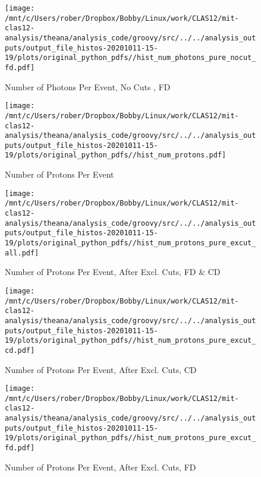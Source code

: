 \documentclass{article}
\begin{document}
\begin{landscape}
\begin{figure}[h]
        \texttt{[image: /mnt/c/Users/rober/Dropbox/Bobby/Linux/work/CLAS12/mit-clas12-analysis/theana/analysis\_code/groovy/src/../../analysis\_outputs/output\_file\_histos-20201011-15-19/plots/original\_python\_pdfs//hist\_num\_photons\_pure\_nocut\_fd.pdf]}
        \captionsetup{textformat=empty,labelformat=blank}
        \caption{Number of Photons Per Event, No Cuts , FD}
    \end{figure}
    \clearpage
    
    \begin{figure}[h]
        \centering

        \texttt{[image: /mnt/c/Users/rober/Dropbox/Bobby/Linux/work/CLAS12/mit-clas12-analysis/theana/analysis\_code/groovy/src/../../analysis\_outputs/output\_file\_histos-20201011-15-19/plots/original\_python\_pdfs//hist\_num\_protons.pdf]}
        \captionsetup{textformat=empty,labelformat=blank}
        \caption{Number of Protons Per Event}
    \end{figure}
    \clearpage
    
    \begin{figure}[h]
        \centering

        \texttt{[image: /mnt/c/Users/rober/Dropbox/Bobby/Linux/work/CLAS12/mit-clas12-analysis/theana/analysis\_code/groovy/src/../../analysis\_outputs/output\_file\_histos-20201011-15-19/plots/original\_python\_pdfs//hist\_num\_protons\_pure\_excut\_all.pdf]}
        \captionsetup{textformat=empty,labelformat=blank}
        \caption{Number of Protons Per Event, After Excl. Cuts, FD \& CD}
    \end{figure}
    \clearpage
    
    \begin{figure}[h]
        \centering

        \texttt{[image: /mnt/c/Users/rober/Dropbox/Bobby/Linux/work/CLAS12/mit-clas12-analysis/theana/analysis\_code/groovy/src/../../analysis\_outputs/output\_file\_histos-20201011-15-19/plots/original\_python\_pdfs//hist\_num\_protons\_pure\_excut\_cd.pdf]}
        \captionsetup{textformat=empty,labelformat=blank}
        \caption{Number of Protons Per Event, After Excl. Cuts, CD}
    \end{figure}
    \clearpage
    
    \begin{figure}[h]
        \centering

        \texttt{[image: /mnt/c/Users/rober/Dropbox/Bobby/Linux/work/CLAS12/mit-clas12-analysis/theana/analysis\_code/groovy/src/../../analysis\_outputs/output\_file\_histos-20201011-15-19/plots/original\_python\_pdfs//hist\_num\_protons\_pure\_excut\_fd.pdf]}
        \captionsetup{textformat=empty,labelformat=blank}
        \caption{Number of Protons Per Event, After Excl. Cuts, FD}
    \end{figure}
    \clearpage
    

\end{landscape}
\end{document}
